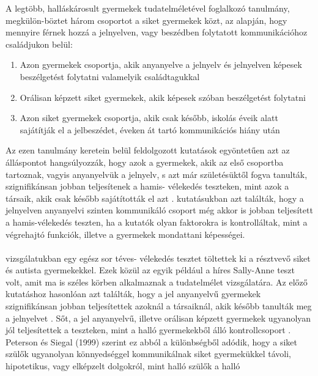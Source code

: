 A legtöbb, halláskárosult gyermekek tudatelméletével foglalkozó tanulmány, megkülön-böztet
három csoportot a siket gyermekek közt, az alapján, hogy mennyire férnek hozzá a
jelnyelven, vagy beszédben folytatott kommunikációhoz családjukon belül:
\begin{enumerate}
	\item Azon gyermekek csoportja, akik anyanyelve a jelnyelv és jelnyelven képesek
	beszél\-getést folytatni valamelyik családtagukkal
	\item Orálisan képzett siket gyermekek, akik képesek szóban beszélgetést folytatni
	\item Azon siket gyermekek csoportja, akik csak később, iskolás éveik alatt sajátítják el a
	jelbeszédet, éveken át tartó kommunikációs hiány után
\end{enumerate}
Az ezen tanulmány keretein belül feldolgozott kutatások egyöntetűen azt az álláspontot
hangsúlyozzák, hogy azok a gyermekek, akik az első csoportba tartoznak, vagyis anyanyelvük
a jelnyelv, s azt már születésüktől fogva tanulták, szignifikánsan jobban teljesítenek a hamis-
vélekedés teszteken, mint azok a társaik, akik csak később sajátították el azt \autocite{woolfe_want_siegal_2002,peterson_siegal_1999,peterson_slaughter_2006,schick_villiers_villiers_hoffmeister_2007}.
\textcite{woolfe_want_siegal_2002} kutatásukban azt találták, hogy a jelnyelven anyanyelvi
szinten kommunikáló csoport még akkor is jobban teljesített a hamis-vélekedés teszten, ha a
kutatók olyan faktorokra is kontrolláltak, mint a végrehajtó funkciók, illetve a gyermekek
mondattani képességei.\\
\\
 \textcite{peterson_siegal_1999} vizsgálatukban egy egész sor téves-
vélekedés tesztet töltettek ki a résztvevő siket és autista gyermekekkel. Ezek közül az egyik például a híres Sally-Anne teszt \autocite{baron-cohen_leslie_frith_1985} volt, amit ma is széles körben alkalmaznak a tudatelmélet vizsgálatára. Az előző kutatáshoz
hasonlóan azt találták, hogy a jel anyanyelvű gyermekek szignifikánsan jobban teljesítettek
azoknál a társaiknál, akik később tanulták meg a jelnyelvet \autocite{peterson_siegal_1999}. Sőt, a jel anyanyelvű,
illetve orálisan képzett gyermekek ugyanolyan jól teljesítettek a teszteken, mint a halló
gyermekekből álló kontrollcsoport \autocite{peterson_siegal_1999}. Peterson és Siegal (1999) szerint ez abból a
különbségből adódik, hogy a siket szülők ugyanolyan könnyedséggel kommunikálnak siket
gyermekükkel távoli, hipotetikus, vagy elképzelt dolgokról, mint halló szülők a halló
